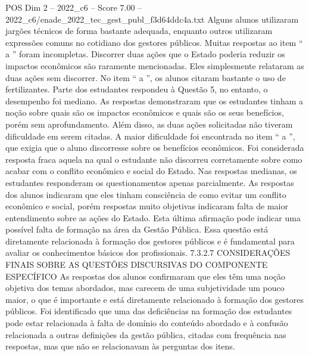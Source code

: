 \begin{textsample}{POS Dim 2 – 2022\_c6 – Score 7.00 – 2022\_c6/enade\_2022\_tec\_gest\_publ\_f3d64ddc4a.txt}
Alguns alunos utilizaram jargões técnicos de forma bastante adequada, enquanto outros utilizaram expressões comuns no cotidiano dos gestores públicos.
Muitas respostas ao item “ a ” foram incompletas.
Discorrer duas ações que o Estado poderia reduzir os impactos econômicos são raramente mencionadas.
Eles simplesmente relataram as duas ações sem discorrer.
No item “ a ”, os alunos citaram bastante o uso de fertilizantes.
Parte dos estudantes respondeu à Questão 5, no entanto, o desempenho foi mediano.
As respostas demonstraram que os estudantes tinham a noção sobre quais são os impactos econômicos e quais são os seus benefícios, porém sem aprofundamento.
Além disso, as duas ações solicitadas não tiveram dificuldade em serem citadas.
A maior dificuldade foi encontrada no item “ a ”, que exigia que o aluno discorresse sobre os benefícios econômicos.
Foi considerada resposta fraca aquela na qual o estudante não discorreu corretamente sobre como acabar com o conflito econômico e social do Estado.
Nas respostas medianas, os estudantes responderam os questionamentos apenas parcialmente.
As respostas dos alunos indicaram que eles tinham consciência de como evitar um conflito econômico e social, porém respostas muito objetivas indicaram falta de maior entendimento sobre as ações do Estado.
Esta última afirmação pode indicar uma possível falta de formação na área da Gestão Pública.
Essa questão está diretamente relacionada à formação dos gestores públicos e é fundamental para avaliar os conhecimentos básicos dos profissionais. 7.3.2.7 CONSIDERAÇÕES FINAIS SOBRE AS QUESTÕES DISCURSIVAS DO COMPONENTE ESPECÍFICO As respostas dos alunos confirmaram que eles têm uma noção objetiva dos temas abordados, mas carecem de uma subjetividade um pouco maior, o que é importante e está diretamente relacionado à formação dos gestores públicos.
Foi identificado que uma das deficiências na formação dos estudantes pode estar relacionada à falta de domínio do conteúdo abordado e à confusão relacionada a outras definições da gestão pública, citadas com frequência nas respostas, mas que não se relacionavam às perguntas dos itens.

\end{textsample}
